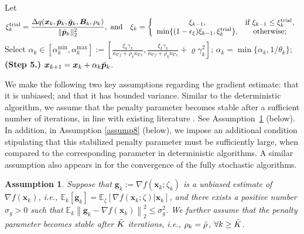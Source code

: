 \documentclass[aos]{imsart}
\numberwithin{equation}{section}
\theoremstyle{plain}
\newtheorem{assumption}{Assumption}
\begin{document}
\begin{algorithm}[htb]
\begin{algorithmic}[1]
  \STATE Let 
  \begin{equation}
  \label{strategy_xi}
   \xi_{k}^{\text{trial}} =  \frac{\Delta q(\bm{x}_k,\Bar{\bm{p}}_k, \Bar{\bm{g}}_k,\bm{B}_k,\rho_k)}{\|\Bar{\bm{p}}_k\|_2^2},
 ~  \text{and} \quad
      \xi_k = \left\{ \begin{array}{cc}
          \xi_{k-1}, & \text{if}~\xi_{k-1} \leq \xi_{k}^{\text{trial}},  \\
          \min\{(1-\epsilon_{\xi})\xi_{k-1},\xi_{k}^{\text{trial}}\},  & \text{otherwise;}
      \end{array} \right.
  \end{equation}
  \STATE Select $\alpha_k \in \left[\alpha_k^{\text{min}}, \alpha_k^{\max} \right] :=  \left[ \frac{ \xi_{k}\gamma_k}{\kappa_{\nabla f} + \rho_k \kappa_{\nabla c}} , \frac{ \xi_{k}\gamma_k}{\kappa_{\nabla f} + \rho_k \kappa_{\nabla c}} + \varrho \gamma_k^2 \right]$;
  \STATE $\alpha_k = \min\{\alpha_k,1/\theta_k\}$;
  \STATE \textbf{(Step 5.)} $\bm{x}_{k+1} = \bm{x}_{k} + \alpha_k \Bar{\bm{p}}_{k}$.
  \ENDFOR
 \end{algorithmic}
 \end{algorithm}
 
We make the following two key assumptions regarding the gradient estimate: that it is unbiased; and that it has bounded variance. 
Similar to the deterministic algorithm, we assume that the penalty parameter becomes stable after a sufficient number of iterations, in line with existing literature \cite{berahas2021sequential, qiu2023sequential}. 
See Assumption~\ref{assump3} (below).
In addition, in Assumption \ref{assump8} (below), we impose an additional condition stipulating that this stabilized penalty parameter must be sufficiently large, when compared to the corresponding parameter in deterministic algorithms. A similar assumption also appears in \cite{berahas2021sequential} for the convergence of the fully stochastic algorithms. 

\begin{assumption}
\label{assump3}
    Suppose that $\bm{g}_k:= \nabla f(\bm{x}_k;\zeta_k)$ is a unbiased estimate of $\nabla f(\bm{x}_k)$, i.e., $\mathbb{E}_k[\bm{g}_k] = \mathbb{E}_{\zeta}\left[ \nabla f(\bm{x}_k;\zeta)|\bm{x}_k\right] $, and there exists a positive number $\sigma_{g}>0$ such that $\mathbb{E}_{k}\left\|\bm{g}_k - \nabla f(\bm{x}_k)  \right\|_2^2 \leq \sigma_{g}^2$. We further assume that the penalty parameter becomes stable after $\Bar{K}$ iterations, i.e., $\rho_k = \Bar{\rho}$, $\forall k \geq \Bar{K}$. 
\end{assumption}
\end{document}
